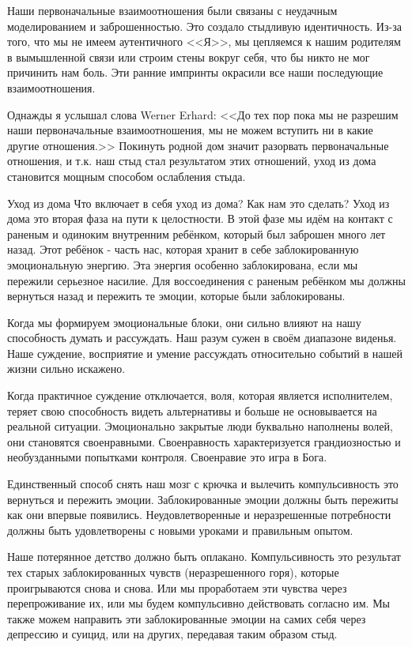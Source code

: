 \documentclass[10pt, fleqn]{article}
\begin{document}
Наши первоначальные взаимоотношения были связаны с неудачным моделированием и заброшенностью. Это создало стыдливую идентичность. Из-за того, что мы не имеем аутентичного <<Я>>, мы цепляемся к нашим родителям в вымышленной связи или строим стены вокруг себя, что бы никто не мог причинить нам боль. Эти ранние импринты окрасили все наши последующие взаимоотношения.

Однажды я услышал слова Werner Erhard: <<До тех пор пока мы не разрешим наши первоначальные взаимоотношения, мы не можем вступить ни в какие другие отношения.>> Покинуть родной дом значит разорвать первоначальные отношения, и т.к. наш стыд стал результатом этих отношений, уход из дома становится мощным способом ослабления стыда.

Уход из дома
Что включает в себя уход из дома? Как нам это сделать?
Уход из дома это вторая фаза на пути к целостности. В этой фазе мы идём на контакт с раненым и одиноким внутренним ребёнком, который был заброшен много лет назад. Этот ребёнок - часть нас, которая хранит в себе заблокированную эмоциональную энергию. Эта энергия особенно заблокирована, если мы пережили серьезное насилие. Для воссоединения с раненым ребёнком мы должны вернуться назад и пережить те эмоции, которые были заблокированы.

Когда мы формируем эмоциональные блоки, они сильно влияют на нашу способность думать и рассуждать. Наш разум сужен в своём диапазоне виденья. Наше суждение, восприятие и умение рассуждать относительно событий в нашей жизни сильно искажено.

Когда практичное суждение отключается, воля, которая является исполнителем, теряет свою способность видеть альтернативы и больше не основывается на реальной ситуации. Эмоционально закрытые люди буквально наполнены волей, они становятся своенравными. Своенравность характеризуется грандиозностью и необузданными попытками контроля. Своенравие это игра в Бога.

Единственный способ снять наш мозг с крючка и вылечить компульсивность это вернуться и пережить эмоции. Заблокированные эмоции должны быть пережиты как они впервые появились. Неудовлетворенные и неразрешенные потребности должны быть удовлетворены с новыми уроками и правильным опытом.

Наше потерянное детство должно быть оплакано. Компульсивность это результат тех старых заблокированных чувств (неразрешенного горя), которые проигрываются снова и снова. Или мы проработаем эти чувства через перепроживание их, или мы будем компульсивно действовать согласно им. Мы также можем направить эти заблокированные эмоции на самих себя через депрессию и суицид, или на других, передавая таким образом стыд.
\end{document}
